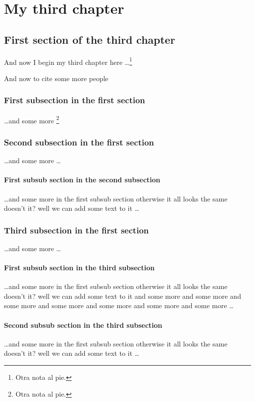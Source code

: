 
\chapter{My third chapter}

\section{First section of the third chapter}
And now I begin my third chapter here \dots \footnote{Otra nota al pie.}

And now to cite some more people~\citet{Rea85,Ancey1996}

\subsection{First subsection in the first section}
\dots and some more  \footnote{Otra nota al pie.}

\subsection{Second subsection in the first section}
\dots and some more \dots

\subsubsection{First subsub section in the second subsection}
\dots and some more in the first subsub section otherwise it all looks the same
doesn't it? well we can add some text to it \dots

\subsection{Third subsection in the first section}
\dots and some more \dots

\subsubsection{First subsub section in the third subsection}
\dots and some more in the first subsub section otherwise it all looks the same
doesn't it? well we can add some text to it and some more and some more and
some more and some more and some more and some more and some more \dots

\subsubsection{Second subsub section in the third subsection}
\dots and some more in the first subsub section otherwise it all looks the same
doesn't it? well we can add some text to it \dots

